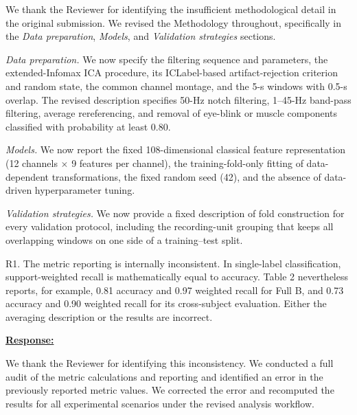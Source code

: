 \documentclass{article}
\begin{document}
We thank the Reviewer for identifying the insufficient methodological detail in
the original submission. We revised the Methodology throughout, specifically in
the \emph{Data preparation}, \emph{Models}, and \emph{Validation strategies}
sections.

\emph{Data preparation.} We now specify the filtering sequence and parameters,
the extended-Infomax ICA procedure, its ICLabel-based artifact-rejection
criterion and random state, the common channel montage, and the 5-s windows
with 0.5-s overlap. The revised description specifies 50-Hz notch filtering,
1--45-Hz band-pass filtering, average rereferencing, and removal of
eye-blink or muscle components classified with probability at least 0.80.

\emph{Models.} We now report the fixed 108-dimensional classical feature
representation (12 channels $\times$ 9 features per channel), the
training-fold-only fitting of data-dependent transformations, the fixed random
seed (42), and the absence of data-driven hyperparameter tuning.

\emph{Validation strategies.} We now provide a fixed description of fold
construction for every validation protocol, including the recording-unit
grouping that keeps all overlapping windows on one side of a training--test
split.

\vspace{0.3cm}


\begin{cmt}{}{}

R1. The metric reporting is internally inconsistent. In single-label
classification, support-weighted recall is mathematically equal to accuracy.
Table 2 nevertheless reports, for example, 0.81 accuracy and 0.97 weighted
recall for Full B, and 0.73 accuracy and 0.90 weighted recall for its
cross-subject evaluation. Either the averaging description or the results are
incorrect.

\end{cmt}
\vspace{0.1cm}
\noindent
\underline{\textbf{Response:}}
\vspace{0.2cm}

We thank the Reviewer for identifying this inconsistency. We conducted a full
audit of the metric calculations and reporting and identified an error in the
previously reported metric values. We corrected the error and recomputed the
results for all experimental scenarios under the revised analysis workflow.
\end{document}
